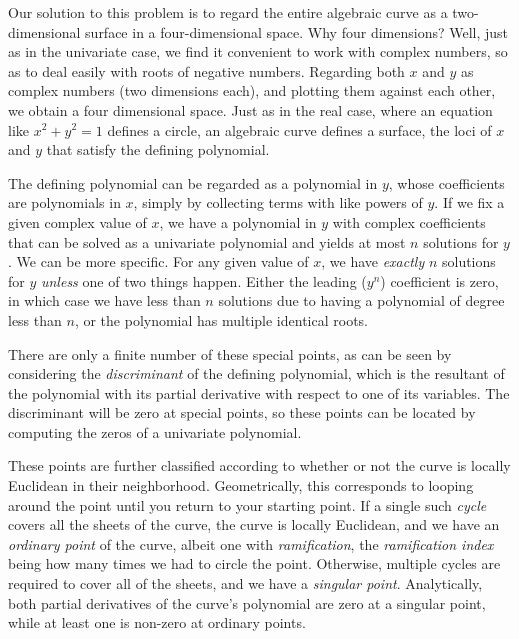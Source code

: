 Our solution to this problem is to regard the entire algebraic curve
as a two-dimensional surface in a four-dimensional space.  Why four
dimensions?  Well, just as in the univariate case, we find it
convenient to work with complex numbers, so as to deal easily with
roots of negative numbers.  Regarding both $x$ and $y$ as complex
numbers (two dimensions each), and plotting them against each other,
we obtain a four dimensional space.  Just as in the real case, where
an equation like $x^2 + y^2 = 1$ defines a circle, an algebraic curve
defines a surface, the loci of $x$ and $y$ that satisfy the defining
polynomial.

The defining polynomial can be regarded as a polynomial in $y$, whose
coefficients are polynomials in $x$, simply by collecting terms with
like powers of $y$.  If we fix a given complex value of $x$, we have a
polynomial in $y$ with complex coefficients that can be solved as a
univariate polynomial and yields at most $n$ solutions for $y$.  We
can be more specific.  For any given value of $x$, we have {\it
exactly} $n$ solutions for $y$ {\it unless} one of two things happen.
Either the leading ($y^n$) coefficient is zero, in which case we have
less than $n$ solutions due to having a polynomial of degree less than
$n$, or the polynomial has multiple identical roots.

There are only a finite number of these special points, as can be seen
by considering the {\it discriminant} of the defining polynomial,
which is the resultant of the polynomial with its partial derivative
with respect to one of its variables.  The discriminant will be zero
at special points, so these points can be located by computing the
zeros of a univariate polynomial.


These points are further classified according to whether or not the
curve is locally Euclidean in their neighborhood.  Geometrically, this
corresponds to looping around the point until you return to your
starting point.  If a single such {\it cycle} covers all the sheets of
the curve, the curve is locally Euclidean, and we have an {\it
ordinary point} of the curve, albeit one with {\it ramification}, the
{\it ramification index} being how many times we had to circle the
point.  Otherwise, multiple cycles are required to cover all of the
sheets, and we have a {\it singular point}.  Analytically, both
partial derivatives of the curve's polynomial are zero at a singular
point, while at least one is non-zero at ordinary points.

